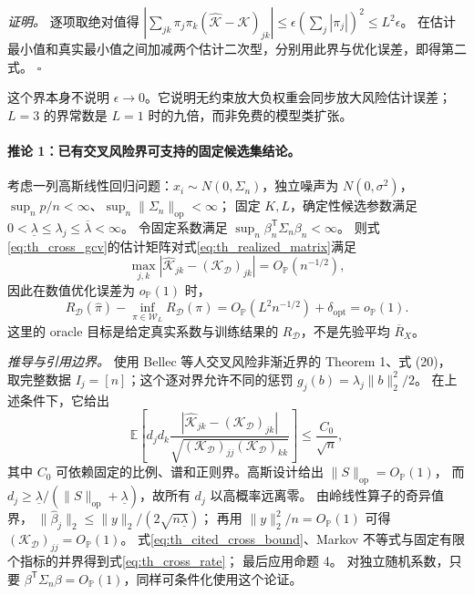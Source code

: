 \textit{证明。}
逐项取绝对值得
$|\sum_{jk}\pi_j\pi_k(\widehat{\mathcal K}-\mathcal K)_{jk}|
\le\epsilon(\sum_j|\pi_j|)^2\le L^2\epsilon$。
在估计最小值和真实最小值之间加减两个估计二次型，分别用此界与优化误差，即得第二式。
\hfill$\square$

这个界本身不说明 $\epsilon\to0$。它说明无约束放大负权重会同步放大风险估计误差；
$L=3$ 的界常数是 $L=1$ 时的九倍，而非免费的模型类扩张。

\paragraph{推论 1：已有交叉风险界可支持的固定候选集结论。}
考虑一列高斯线性回归问题：$x_i\sim N(0,\Sigma_n)$，独立噪声为 $N(0,\sigma^2)$，
$\sup_n p/n<\infty$、$\sup_n\lVert\Sigma_n\rVert_{\mathrm{op}}<\infty$；
固定 $K,L$，确定性候选参数满足
$0<\underline\lambda\le\lambda_j\le\overline\lambda<\infty$。
令固定系数满足 $\sup_n\beta_n^{\mathsf T}\Sigma_n\beta_n<\infty$。
则式\eqref{eq:th_cross_gcv}的估计矩阵对式\eqref{eq:th_realized_matrix}满足
\begin{equation}\label{eq:th_cross_rate}
 \max_{j,k}|\widehat{\mathcal K}_{jk}-(\mathcal K_{\mathcal D})_{jk}|
 =O_{\mathbb P}(n^{-1/2}),
\end{equation}
因此在数值优化误差为 $o_{\mathbb P}(1)$ 时，
\begin{equation}\label{eq:th_cross_consistency}
 R_{\mathcal D}(\widehat\pi)-\inf_{\pi\in\mathcal W_L}R_{\mathcal D}(\pi)
 =O_{\mathbb P}(L^2n^{-1/2})+\delta_{\mathrm{opt}}=o_{\mathbb P}(1).
\end{equation}
这里的 oracle 目标是给定真实系数与训练结果的 $R_{\mathcal D}$，不是先验平均 $\overline R_X$。

\textit{推导与引用边界。}
使用 Bellec 等人交叉风险非渐近界\cite{bellec}的 Theorem 1、式 (20)，
取完整数据 $I_j=[n]$；这个逐对界允许不同的惩罚 $g_j(b)=\lambda_j\lVert b\rVert_2^2/2$。
在上述条件下，它给出
\begin{equation}\label{eq:th_cited_cross_bound}
 \mathbb E\left[
 d_jd_k\frac{|\widehat{\mathcal K}_{jk}-(\mathcal K_{\mathcal D})_{jk}|}
 {\sqrt{(\mathcal K_{\mathcal D})_{jj}(\mathcal K_{\mathcal D})_{kk}}}
 \right]\le\frac{C_0}{\sqrt n},
\end{equation}
其中 $C_0$ 可依赖固定的比例、谱和正则界。高斯设计给出 $\lVert S\rVert_{\mathrm{op}}=O_{\mathbb P}(1)$，
而 $d_j\ge\underline\lambda/(\lVert S\rVert_{\mathrm{op}}+\underline\lambda)$，故所有 $d_j$ 以高概率远离零。
由岭线性算子的奇异值界，
$\lVert\widehat\beta_j\rVert_2\le\lVert y\rVert_2/(2\sqrt{n\underline\lambda})$；
再用 $\lVert y\rVert_2^2/n=O_{\mathbb P}(1)$ 可得 $(\mathcal K_{\mathcal D})_{jj}=O_{\mathbb P}(1)$。
式\eqref{eq:th_cited_cross_bound}、Markov 不等式与固定有限个指标的并界得到式\eqref{eq:th_cross_rate}；
最后应用命题 4。
对独立随机系数，只要 $\beta^{\mathsf T}\Sigma_n\beta=O_{\mathbb P}(1)$，同样可条件化使用这个论证。

